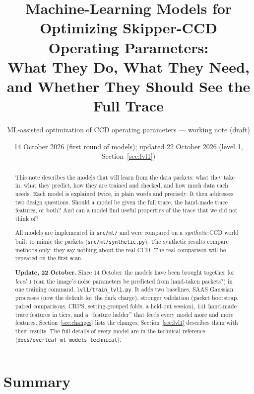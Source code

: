 \documentclass[10pt]{article}
\title{Machine-Learning Models for Optimizing Skipper-CCD Operating Parameters:\\
What They Do, What They Need, and Whether They Should See the Full Trace}
\author{ML-assisted optimization of CCD operating parameters --- working note (draft)}
\date{14 October 2026 (first round of models); updated 22 October 2026 (level 1, Section~\ref{sec:lvl1})}
\newcommand{\code}[1]{\texttt{#1}}
\begin{document}
\maketitle

\begin{abstract}
This note describes the models that will learn from the data packets: what they take in, what they predict, how they are
trained and checked, and how much data each needs. Each model is explained twice, in plain words and precisely. It then
addresses two design questions. Should a model be given the full trace, the hand-made trace features, or both? And can a
model find useful properties of the trace that we did not think of?

All models are implemented in \code{src/ml/} and were compared on a \emph{synthetic} CCD world built to mimic the packets
(\code{src/ml/synthetic.py}). The synthetic results compare methods only; they say nothing about the real CCD. The real
comparison will be repeated on the first scan.

\textbf{Update, 22 October.} Since 14 October the models have been brought together for \emph{level 1} (can the image's noise
parameters be predicted from hand-taken packets?) in one training command, \code{lvl1/train\_lvl1.py}. It adds two baselines, SAAS
Gaussian processes (now the default for the dark charge), stronger validation (packet bootstrap, paired comparisons, CRPS,
setting-grouped folds, a held-out session), 141 hand-made trace features in tiers, and a ``feature ladder'' that feeds every model
more and more features. Section~\ref{sec:changes} lists the changes; Section~\ref{sec:lvl1} describes them with their results. The
full details of every model are in the technical reference (\code{docs/overleaf\_ml\_models\_technical}).
\end{abstract}

\tableofcontents

\section{Summary}
\end{document}
